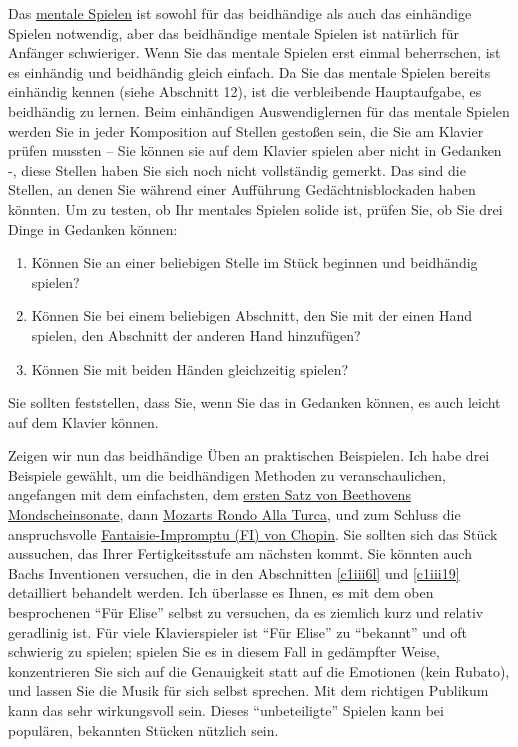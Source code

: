Das \hyperref[c1ii12mental]{mentale Spielen} ist sowohl für das beidhändige als auch das einhändige Spielen notwendig, aber das beidhändige mentale Spielen ist natürlich für Anfänger schwieriger.
Wenn Sie das mentale Spielen erst einmal beherrschen, ist es einhändig und beidhändig gleich einfach.
Da Sie das mentale Spielen bereits einhändig kennen (siehe Abschnitt 12), ist die verbleibende Hauptaufgabe, es beidhändig zu lernen.
Beim einhändigen Auswendiglernen für das mentale Spielen werden Sie in jeder Komposition auf Stellen gestoßen sein, die Sie am Klavier prüfen mussten -- Sie können sie auf dem Klavier spielen aber nicht in Gedanken -, diese Stellen haben Sie sich noch nicht vollständig gemerkt.
Das sind die Stellen, an denen Sie während einer Aufführung Gedächtnisblockaden haben könnten.
Um zu testen, ob Ihr mentales Spielen solide ist, prüfen Sie, ob Sie drei Dinge in Gedanken können:

\begin{enumerate}[label={\arabic*.}] 
 \item Können Sie an einer beliebigen Stelle im Stück beginnen und beidhändig spielen?
 \item Können Sie bei einem beliebigen Abschnitt, den Sie mit der einen Hand spielen, den Abschnitt der anderen Hand hinzufügen?
 \item Können Sie mit beiden Händen gleichzeitig spielen?
\end{enumerate}

Sie sollten feststellen, dass Sie, wenn Sie das in Gedanken können, es auch leicht auf dem Klavier können.

Zeigen wir nun das beidhändige Üben an praktischen Beispielen.
Ich habe drei Beispiele gewählt, um die beidhändigen Methoden zu veranschaulichen, angefangen mit dem einfachsten, dem \hyperref[c1ii25b]{ersten Satz von Beethovens Mondscheinsonate}, dann \hyperref[c1ii25c]{Mozarts Rondo Alla Turca}, und zum Schluss die anspruchsvolle \hyperref[c1ii25d]{Fantaisie-Impromptu (FI) von Chopin}.
Sie sollten sich das Stück aussuchen, das Ihrer Fertigkeitsstufe am nächsten kommt.
Sie könnten auch Bachs Inventionen versuchen, die in den Abschnitten \hyperref[c1iii6l]{\autoref{c1iii6l}} und \hyperref[c1iii19]{\autoref{c1iii19}} detailliert behandelt werden.
Ich überlasse es Ihnen, es mit dem oben besprochenen \enquote{Für Elise} selbst zu versuchen, da es ziemlich kurz und relativ geradlinig ist.
Für viele Klavierspieler ist \enquote{Für Elise} zu \enquote{bekannt} und oft schwierig zu spielen; spielen Sie es in diesem Fall in gedämpfter Weise, konzentrieren Sie sich auf die Genauigkeit statt auf die Emotionen (kein Rubato), und lassen Sie die Musik für sich selbst sprechen.
Mit dem richtigen Publikum kann das sehr wirkungsvoll sein.
Dieses \enquote{unbeteiligte} Spielen kann bei populären, bekannten Stücken nützlich sein.

